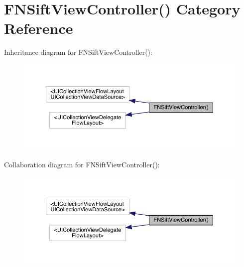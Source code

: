 \hypertarget{category_f_n_sift_view_controller_07_08}{}\section{F\+N\+Sift\+View\+Controller() Category Reference}
\label{category_f_n_sift_view_controller_07_08}


Inheritance diagram for F\+N\+Sift\+View\+Controller()\+:\nopagebreak
\begin{figure}[H]
\begin{center}
\leavevmode
\includegraphics[width=350pt]{category_f_n_sift_view_controller_07_08__inherit__graph}
\end{center}
\end{figure}


Collaboration diagram for F\+N\+Sift\+View\+Controller()\+:\nopagebreak
\begin{figure}[H]
\begin{center}
\leavevmode
\includegraphics[width=350pt]{category_f_n_sift_view_controller_07_08__coll__graph}
\end{center}
\end{figure}
